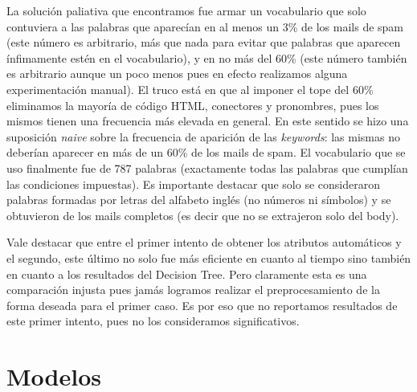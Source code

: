 \documentclass[hidelinks,a4paper,11pt, nofootinbib]{article}
\begin{document}
La solución paliativa que encontramos fue armar un vocabulario que solo contuviera a las palabras que aparecían en al menos un 3\% de los mails de spam (este número es arbitrario, más que nada para evitar que palabras que aparecen ínfimamente estén en el vocabulario), y en no más del 60\% (este número también es arbitrario aunque un poco menos pues en efecto realizamos alguna experimentación manual). El truco está en que al imponer el tope del 60\% eliminamos la mayoría de código HTML, conectores y pronombres, pues los mismos tienen una frecuencia más elevada en general. En este sentido se hizo una suposición \emph{naive} sobre la frecuencia de aparición de las \emph{keywords}: las mismas no deberían aparecer en más de un 60\% de los mails de spam. El vocabulario que se uso finalmente fue de 787 palabras (exactamente todas las palabras que cumplían las condiciones impuestas). Es importante destacar que solo se consideraron palabras formadas por letras del alfabeto inglés (no números ni símbolos) y se obtuvieron de los mails completos (es decir que no se extrajeron solo del body).

Vale destacar que entre el primer intento de obtener los atributos automáticos y el segundo, este último no solo fue más eficiente en cuanto al tiempo sino también en cuanto a los resultados del Decision Tree. Pero claramente esta es una comparación injusta pues jamás logramos realizar el preprocesamiento de la forma deseada para el primer caso. Es por eso que no reportamos resultados de este primer intento, pues no los consideramos significativos.


\section{Modelos}
\end{document}
